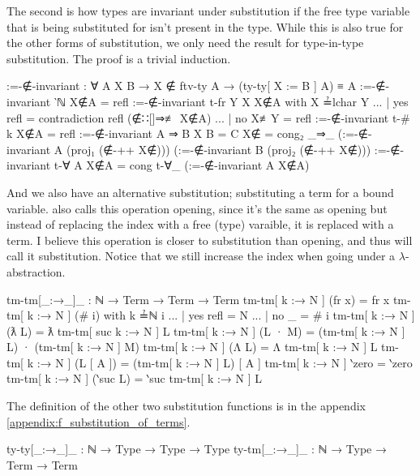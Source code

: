 \documentclass[logo,bsc,singlespacing,parskip,online]{infthesis}
\begin{document}
The second is how types are invariant under substitution if the free type variable that is being
substituted for isn't present in the type. While this is also true for the other forms of
substitution, we only need the result for type-in-type substitution. The proof is a trivial
induction.
\begin{code}
  :=-∉-invariant : ∀ {A X B} → X ∉ ftv-ty A
    → (ty-ty[ X := B ] A) ≡ A
  :=-∉-invariant {‵ℕ} X∉A = refl
  :=-∉-invariant {t-fr Y} {X} X∉A with X ≟lchar Y
  ... | yes refl = contradiction refl (∉∷[]⇒≢ X∉A)
  ... | no  X≢Y  = refl
  :=-∉-invariant {t-# k} X∉A = refl
  :=-∉-invariant {A ⇒ B} {X} {B = C} X∉ = cong₂ _⇒_
    (:=-∉-invariant {A} (proj₁ (∉-++ X∉)))
    (:=-∉-invariant {B} (proj₂ (∉-++ X∉)))
  :=-∉-invariant {t-∀ A} X∉A = cong t-∀_ (:=-∉-invariant {A} X∉A)
\end{code}

And we also have an alternative substitution; substituting a term for a bound variable.
\citet{chargueraud_locally_2012} also calls this operation opening, since it's the same as opening
but instead of replacing the index with a free (type) varaible, it is replaced with a term. I
believe this operation is closer to substitution than opening, and thus will call it substitution.
Notice that we still increase the index when going under a $\lambda$-abstraction.
\begin{code}
  tm-tm[_:→_]_ : ℕ → Term → Term → Term
  tm-tm[ k :→ N ] (fr x) = fr x
  tm-tm[ k :→ N ] (# i) with k ≟ℕ i
  ... | yes refl = N
  ... | no  _    = # i
  tm-tm[ k :→ N ] (ƛ L) = ƛ tm-tm[ suc k :→ N ] L
  tm-tm[ k :→ N ] (L · M) = (tm-tm[ k :→ N ] L) · (tm-tm[ k :→ N ] M)
  tm-tm[ k :→ N ] (Λ L) = Λ tm-tm[ k :→ N ] L
  tm-tm[ k :→ N ] (L [ A ]) = (tm-tm[ k :→ N ] L) [ A ]
  tm-tm[ k :→ N ] ‵zero = ‵zero
  tm-tm[ k :→ N ] (‵suc L) = ‵suc tm-tm[ k :→ N ] L
\end{code}
The definition of the other two substitution functions is in the appendix \ref{appendix:f_substitution_of_terms}.
\begin{code}
  ty-ty[_:→_]_ : ℕ → Type → Type → Type
  ty-tm[_:→_]_ : ℕ → Type → Term → Term
\end{code}
\begin{comment}
\begin{code}
  ty-ty[ k :→ T ] ‵ℕ = ‵ℕ
  ty-ty[ k :→ T ] (t-fr x) = t-fr x
  ty-ty[ k :→ T ] (t-# i) with k ≟ℕ i
  ... | yes refl = T
  ... | no  _    = t-# i
  ty-ty[ k :→ T ] (A ⇒ B) = (ty-ty[ k :→ T ] A) ⇒ (ty-ty[ k :→ T ] B)
  ty-ty[ k :→ T ] (t-∀ A) = t-∀ (ty-ty[ (suc k) :→ T ] A)

  ty-tm[ k :→ T ] (fr x) = fr x
  ty-tm[ k :→ T ] (# i) = # i
  ty-tm[ k :→ T ] (ƛ L) = ƛ ty-tm[ k :→ T ] L
  ty-tm[ k :→ T ] (L · M) = (ty-tm[ k :→ T ] L) · (ty-tm[ k :→ T ] M)
  ty-tm[ k :→ T ] (Λ L) = Λ ty-tm[ suc k :→ T ] L
  ty-tm[ k :→ T ] (L [ A ]) = (ty-tm[ k :→ T ] L) [ ty-ty[ k :→ T ] A ]
  ty-tm[ k :→ T ] ‵zero = ‵zero
  ty-tm[ k :→ T ] (‵suc L) = ‵suc ty-tm[ k :→ T ] L
\end{code}
\end{comment}
\end{document}
